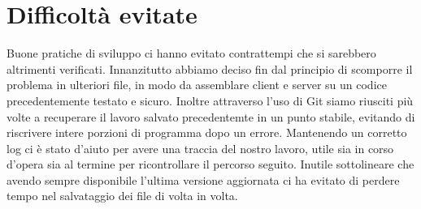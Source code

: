 \documentclass[a4paper, 11pt]{article} %
\begin{document}
\section*{Difficoltà evitate}
Buone pratiche di sviluppo ci hanno evitato contrattempi che si sarebbero altrimenti verificati. Innanzitutto abbiamo deciso fin dal principio di scomporre il problema in ulteriori file, in modo da assemblare client e server su un codice precedentemente testato e sicuro. Inoltre attraverso l'uso di Git siamo riusciti più volte a recuperare il lavoro salvato precedentemte in un punto stabile, evitando di riscrivere intere porzioni di programma dopo un errore. Mantenendo un corretto log ci è stato d'aiuto per avere una traccia del nostro lavoro, utile sia in corso d'opera sia al termine per ricontrollare il percorso seguito. Inutile sottolineare che avendo sempre disponibile l'ultima versione aggiornata ci ha evitato di perdere tempo nel salvataggio dei file di volta in volta.
\end{document}
